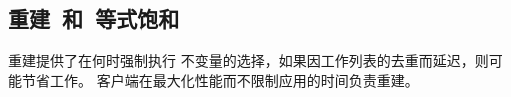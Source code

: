 \subsection{重建~和~等式饱和}
\label{sec:rebuilding-eqsat}

重建提供了在何时强制执行 \egraph 不变量的选择，如果因工作列表的去重而延迟，则可能节省工作。
客户端在最大化性能而不限制应用的时间负责重建。


